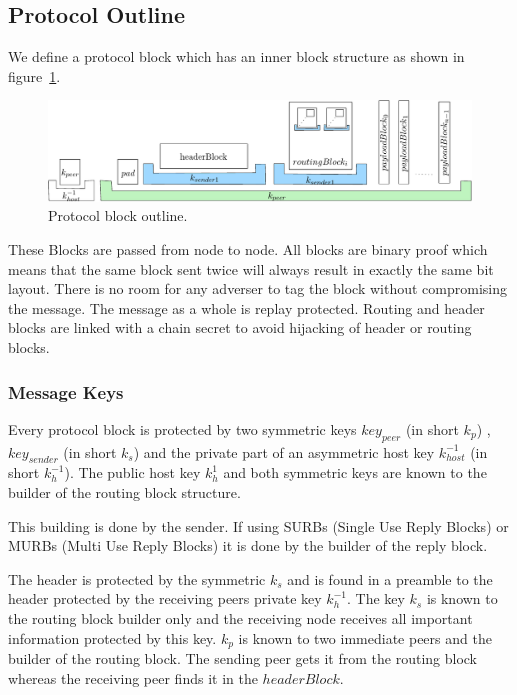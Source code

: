 \documentclass[9pt,journal,compsoc]{IEEEtran}
\begin{document}
\subsection{Protocol Outline}
We define a protocol block which has an inner block structure as shown in figure~\ref{fig:blocks}.

\begin{figure}[!t]
	\centering
	\includegraphics[width=\columnwidth]{../inc/blockLayoutSimplified}
	\caption{Protocol block outline.}
	\label{fig:blocks}
\end{figure}

These Blocks are passed from node to node. All blocks are binary proof which means that the same block sent twice will always result in exactly the same bit layout. There is no room for any adverser to tag the block without compromising the message. The message as a whole is replay protected. Routing and header blocks are linked with a chain secret to avoid hijacking of header or routing blocks.

\subsubsection{Message Keys}
Every protocol block is protected by two symmetric keys $key_{peer}$ (in short $k_p$) , $key_{sender}$ (in short $k_s$) and the private part of an asymmetric host key $k^{-1}_{host}$ (in short $k^{-1}_h$). The public host key $k^{1}_h$ and both symmetric keys are known to the builder of the routing block structure. 

This building is done by the sender. If using SURBs (Single Use Reply Blocks) or MURBs (Multi Use Reply Blocks) it is done by the builder of the reply block. 

The header is protected by the symmetric $k_s$ and is found in a preamble to the header protected by the receiving peers private key $k^{-1}_h$. The key $k_s$ is known to the routing block builder only and the receiving node receives all important information protected by this key. $k_{p}$ is known to two immediate peers and the builder of the routing block. The sending peer gets it from the routing block whereas the receiving peer finds it in the $headerBlock$. 
\end{document}
